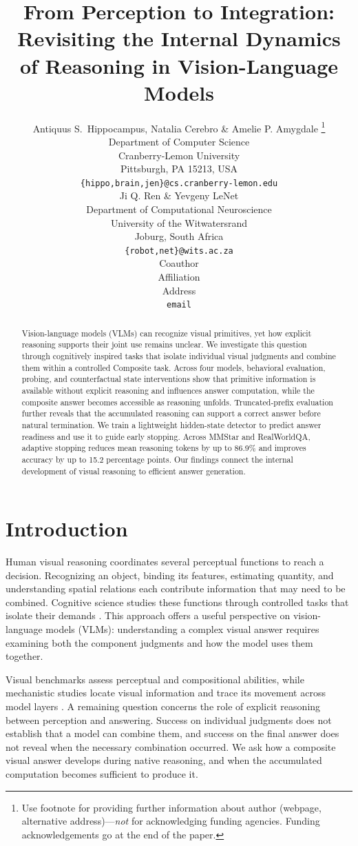 \documentclass{article} %
\title{From Perception to Integration: \\ Revisiting the Internal Dynamics of Reasoning in Vision-Language Models}
\author{Antiquus S.~Hippocampus, Natalia Cerebro \& Amelie P. Amygdale \thanks{ Use footnote for providing further information
about author (webpage, alternative address)---\emph{not} for acknowledging
funding agencies.  Funding acknowledgements go at the end of the paper.} \\
Department of Computer Science\\
Cranberry-Lemon University\\
Pittsburgh, PA 15213, USA \\
\texttt{\{hippo,brain,jen\}@cs.cranberry-lemon.edu} \\
\And
Ji Q. Ren \& Yevgeny LeNet \\
Department of Computational Neuroscience \\
University of the Witwatersrand \\
Joburg, South Africa \\
\texttt{\{robot,net\}@wits.ac.za} \\
\AND
Coauthor \\
Affiliation \\
Address \\
\texttt{email}
}
\begin{document}
\raggedbottom


\maketitle

\begin{abstract}
Vision-language models (VLMs) can recognize visual primitives, yet how explicit reasoning supports their joint use remains unclear. We investigate this question through cognitively inspired tasks that isolate individual visual judgments and combine them within a controlled Composite task. Across four models, behavioral evaluation, probing, and counterfactual state interventions show that primitive information is available without explicit reasoning and influences answer computation, while the composite answer becomes accessible as reasoning unfolds. Truncated-prefix evaluation further reveals that the accumulated reasoning can support a correct answer before natural termination. We train a lightweight hidden-state detector to predict answer readiness and use it to guide early stopping. Across MMStar and RealWorldQA, adaptive stopping reduces mean reasoning tokens by up to 86.9\% and improves accuracy by up to 15.2 percentage points. Our findings connect the internal development of visual reasoning to efficient answer generation.
\end{abstract}

\section{Introduction}

Human visual reasoning coordinates several perceptual functions to reach a decision. Recognizing an object, binding its features, estimating quantity, and understanding spatial relations each contribute information that may need to be combined. Cognitive science studies these functions through controlled tasks that isolate their demands \citep{treisman1980feature,feigenson2004core,logan1994spatial,kellman1991theory}. This approach offers a useful perspective on vision-language models (VLMs): understanding a complex visual answer requires examining both the component judgments and how the model uses them together.

Visual benchmarks assess perceptual and compositional abilities, while mechanistic studies locate visual information and trace its movement across model layers \citep{johnson2017clevr,huang2025visfactor,neo2025interpreting,zhang2025crossmodal}. A remaining question concerns the role of explicit reasoning between perception and answering. Success on individual judgments does not establish that a model can combine them, and success on the final answer does not reveal when the necessary combination occurred. We ask how a composite visual answer develops during native reasoning, and when the accumulated computation becomes sufficient to produce it.
\end{document}
